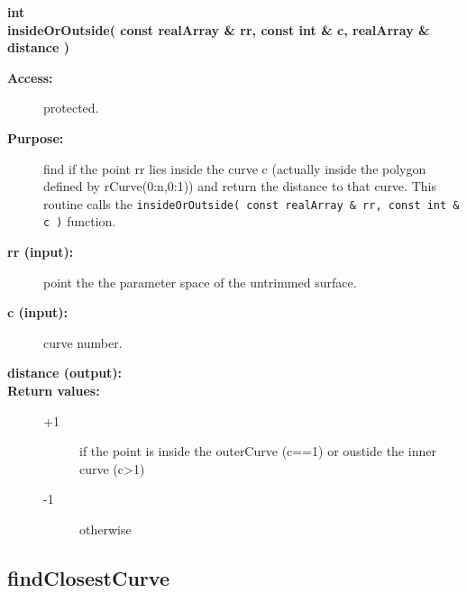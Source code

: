 \begin{flushleft} \textbf{%
int  \\ 
\settowidth{\TrimmedMappingIncludeArgIndent}{insideOrOutside(}%
insideOrOutside( const realArray \& rr, const int \& c, realArray \& distance )
}\end{flushleft}
\begin{description}
\item[{\bf Access:}]  protected.
\item[{\bf Purpose:}]  find if the point rr lies inside the curve c 
      (actually inside the polygon defined by rCurve(0:n,0:1)) and return
   the distance to that curve. This routine calls the 
   {\tt insideOrOutside( const realArray \& rr, const int \& c )}
   function.
\item[{\bf rr (input):}]  point the the parameter space of the untrimmed surface.
\item[{\bf c (input):}]  curve number.
\item[{\bf distance (output):}]  
\item[{\bf Return values:}] 
  \begin{description}
    \item[+1] if the point is inside the outerCurve (c==1) or oustide the inner curve (c>1)
    \item[-1] otherwise
  \end{description}   
\end{description}
\subsection{findClosestCurve}
 
